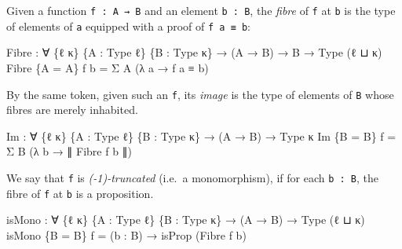 \documentclass[
  11pt,
  oneside,
  article]{memoir}
\newenvironment{Shaded}{}{}
\newcommand{\NormalTok}[1]{#1}
\newcommand{\OtherTok}[1]{\textcolor[rgb]{0.00,0.44,0.13}{#1}}
\theoremstyle{definition}
\theoremstyle{plain}
\newcommand{\0}{\textsf{0}}
\newcommand{\1}{\tn{\textsf{1}}}
\begin{document}
Given a function \texttt{f\ :\ A\ →\ B} and an element \texttt{b\ :\ B},
the \emph{fibre} of \texttt{f} at \texttt{b} is the type of elements of
\texttt{a} equipped with a proof of \texttt{f\ a\ ≡\ b}:

\begin{Shaded}
\begin{Highlighting}[]
\NormalTok{Fibre }\OtherTok{:} \OtherTok{∀} \OtherTok{\{}\NormalTok{ℓ κ}\OtherTok{\}} \OtherTok{\{}\NormalTok{A }\OtherTok{:}\NormalTok{ Type ℓ}\OtherTok{\}} \OtherTok{\{}\NormalTok{B }\OtherTok{:}\NormalTok{ Type κ}\OtherTok{\}} \OtherTok{→} \OtherTok{(}\NormalTok{A }\OtherTok{→}\NormalTok{ B}\OtherTok{)} \OtherTok{→}\NormalTok{ B }\OtherTok{→}\NormalTok{ Type }\OtherTok{(}\NormalTok{ℓ ⊔ κ}\OtherTok{)}
\NormalTok{Fibre }\OtherTok{\{}\NormalTok{A }\OtherTok{=}\NormalTok{ A}\OtherTok{\}}\NormalTok{ f b }\OtherTok{=}\NormalTok{ Σ A }\OtherTok{(λ}\NormalTok{ a }\OtherTok{→}\NormalTok{ f a ≡ b}\OtherTok{)}
\end{Highlighting}
\end{Shaded}

By the same token, given such an \texttt{f}, its \emph{image} is the
type of elements of \texttt{B} whose fibres are merely inhabited.

\begin{Shaded}
\begin{Highlighting}[]
\NormalTok{Im }\OtherTok{:} \OtherTok{∀} \OtherTok{\{}\NormalTok{ℓ κ}\OtherTok{\}} \OtherTok{\{}\NormalTok{A }\OtherTok{:}\NormalTok{ Type ℓ}\OtherTok{\}} \OtherTok{\{}\NormalTok{B }\OtherTok{:}\NormalTok{ Type κ}\OtherTok{\}} \OtherTok{→} \OtherTok{(}\NormalTok{A }\OtherTok{→}\NormalTok{ B}\OtherTok{)} \OtherTok{→}\NormalTok{ Type κ}
\NormalTok{Im }\OtherTok{\{}\NormalTok{B }\OtherTok{=}\NormalTok{ B}\OtherTok{\}}\NormalTok{ f }\OtherTok{=}\NormalTok{ Σ B }\OtherTok{(λ}\NormalTok{ b }\OtherTok{→}\NormalTok{ ∥ Fibre f b ∥}\OtherTok{)}
\end{Highlighting}
\end{Shaded}

We say that \texttt{f} is \emph{(-1)-truncated} (i.e.~a monomorphism),
if for each \texttt{b\ :\ B}, the fibre of \texttt{f} at \texttt{b} is a
proposition.

\begin{Shaded}
\begin{Highlighting}[]
\NormalTok{isMono }\OtherTok{:} \OtherTok{∀} \OtherTok{\{}\NormalTok{ℓ κ}\OtherTok{\}} \OtherTok{\{}\NormalTok{A }\OtherTok{:}\NormalTok{ Type ℓ}\OtherTok{\}} \OtherTok{\{}\NormalTok{B }\OtherTok{:}\NormalTok{ Type κ}\OtherTok{\}} \OtherTok{→} \OtherTok{(}\NormalTok{A }\OtherTok{→}\NormalTok{ B}\OtherTok{)} \OtherTok{→}\NormalTok{ Type }\OtherTok{(}\NormalTok{ℓ ⊔ κ}\OtherTok{)}
\NormalTok{isMono }\OtherTok{\{}\NormalTok{B }\OtherTok{=}\NormalTok{ B}\OtherTok{\}}\NormalTok{ f }\OtherTok{=} \OtherTok{(}\NormalTok{b }\OtherTok{:}\NormalTok{ B}\OtherTok{)} \OtherTok{→}\NormalTok{ isProp }\OtherTok{(}\NormalTok{Fibre f b}\OtherTok{)}
\end{Highlighting}
\end{Shaded}
\end{document}
